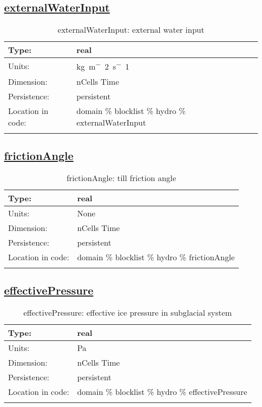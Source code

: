 \subsection[externalWaterInput]{\hyperref[sec:var_tab_hydro]{externalWaterInput}}
\label{subsec:var_sec_hydro_externalWaterInput}
\begin{center}
\begin{longtable}{| p{2.0in} | p{4.0in} |}
        \hline 
        Type: & real \\
        \hline 
        Units: & \si{kg.m^-2.s^-1} \\
        \hline 
        Dimension: & nCells Time \\
        \hline 
        Persistence: & persistent \\
        \hline 
         Location in code: & domain \% blocklist \% hydro \% externalWaterInput \\
         \hline 
    \caption{externalWaterInput: external water input}
\end{longtable}
\end{center}
\subsection[frictionAngle]{\hyperref[sec:var_tab_hydro]{frictionAngle}}
\label{subsec:var_sec_hydro_frictionAngle}
\begin{center}
\begin{longtable}{| p{2.0in} | p{4.0in} |}
        \hline 
        Type: & real \\
        \hline 
        Units: & \si{None} \\
        \hline 
        Dimension: & nCells Time \\
        \hline 
        Persistence: & persistent \\
        \hline 
         Location in code: & domain \% blocklist \% hydro \% frictionAngle \\
         \hline 
    \caption{frictionAngle: till friction angle}
\end{longtable}
\end{center}
\subsection[effectivePressure]{\hyperref[sec:var_tab_hydro]{effectivePressure}}
\label{subsec:var_sec_hydro_effectivePressure}
\begin{center}
\begin{longtable}{| p{2.0in} | p{4.0in} |}
        \hline 
        Type: & real \\
        \hline 
        Units: & \si{Pa} \\
        \hline 
        Dimension: & nCells Time \\
        \hline 
        Persistence: & persistent \\
        \hline 
         Location in code: & domain \% blocklist \% hydro \% effectivePressure \\
         \hline 
    \caption{effectivePressure: effective ice pressure in subglacial system}
\end{longtable}
\end{center}
